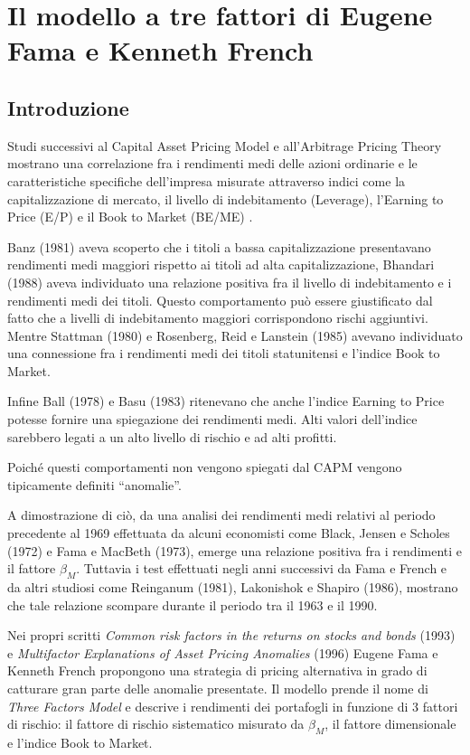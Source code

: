 \chapter{Il modello a tre fattori di Eugene Fama e Kenneth French}
\label{chaptre}

\section{Introduzione}


Studi successivi al Capital Asset Pricing Model e all'Arbitrage Pricing Theory mostrano una correlazione fra i rendimenti medi delle azioni ordinarie e le caratteristiche specifiche dell'impresa misurate attraverso indici come la capitalizzazione di mercato, il livello di indebitamento (Leverage), l'Earning to Price (E/P) e il Book to Market (BE/ME) \cite{fama_common_1993}.

Banz (1981) aveva scoperto che i titoli a bassa capitalizzazione presentavano rendimenti medi maggiori rispetto ai titoli ad alta capitalizzazione, Bhandari (1988) aveva individuato una relazione positiva fra il livello di indebitamento e i rendimenti medi dei titoli. Questo comportamento può essere giustificato dal fatto che a livelli di indebitamento maggiori corrispondono rischi aggiuntivi. 
Mentre Stattman (1980) e Rosenberg, Reid  e Lanstein  (1985) avevano individuato una connessione fra i rendimenti medi dei titoli statunitensi e l'indice Book to Market.

Infine Ball (1978) e Basu (1983) ritenevano che anche l'indice Earning to Price potesse fornire una spiegazione dei rendimenti medi. Alti valori dell'indice sarebbero legati a un alto livello di rischio e ad alti profitti. 

Poiché questi comportamenti non vengono spiegati dal CAPM vengono tipicamente definiti “anomalie”. 

A dimostrazione di ciò, da una analisi dei rendimenti medi relativi al periodo precedente al 1969 effettuata da alcuni economisti come Black, Jensen e Scholes (1972) e Fama e MacBeth (1973), emerge una relazione positiva fra i rendimenti e il fattore $\beta_M$. Tuttavia i test effettuati negli anni successivi da Fama e French e da altri studiosi come Reinganum (1981), Lakonishok e Shapiro (1986), mostrano che tale relazione scompare durante il periodo tra il 1963 e il 1990.

Nei propri scritti \textit{Common risk factors in the returns on stocks and bonds} (1993) \cite{fama_common_1993} e \textit{Multifactor Explanations of Asset Pricing Anomalies} (1996) \cite{fama_multifactor_1996} Eugene Fama e Kenneth French propongono una strategia di pricing alternativa in grado di catturare gran parte delle anomalie presentate. Il modello prende il nome di \textit{Three Factors Model} e descrive i rendimenti dei portafogli in funzione di 3 fattori di rischio: il fattore di rischio sistematico misurato da $\beta_M$, il fattore dimensionale e l'indice Book to Market. 

